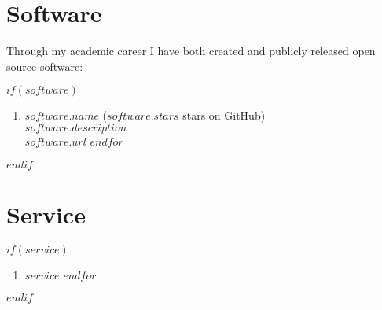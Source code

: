 \documentclass[$fontsize$, a4paper]{article}
\begin{document}
\section*{Software}
Through my academic career I have both created and publicly released open source software:

$if(software)$
\begin{enumerate}
$for(software)$
\item \textit{$software.name$}  ($software.stars$ stars on GitHub)\\$software.description$\\$software.url$
$endfor$
\end{enumerate}
$endif$

%

\section*{Service}
$if(service)$
\begin{enumerate}
$for(service)$
\item $service$
$endfor$
\end{enumerate}
$endif$
\end{document}
